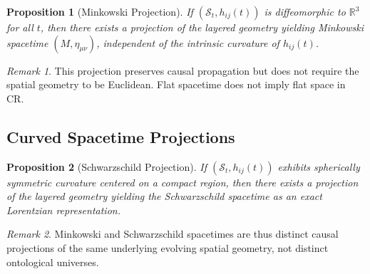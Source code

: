 \documentclass[11pt,a4paper]{article}
\theoremstyle{plain}
\newtheorem{proposition}{Proposition}
\theoremstyle{definition}
\theoremstyle{remark}
\newtheorem{remark}{Remark}
\begin{document}
\begin{proposition}[Minkowski Projection]
If $(\mathcal{S}_t,h_{ij}(t))$ is diffeomorphic to $\mathbb{R}^3$ for all $t$, then there exists a projection of the layered geometry yielding Minkowski spacetime $(M,\eta_{\mu\nu})$, independent of the intrinsic curvature of $h_{ij}(t)$.
\end{proposition}

\begin{remark}
This projection preserves causal propagation but does not require the spatial geometry to be Euclidean. Flat spacetime does not imply flat space in CR.
\end{remark}

\subsection{Curved Spacetime Projections}

\begin{proposition}[Schwarzschild Projection]
If $(\mathcal{S}_t,h_{ij}(t))$ exhibits spherically symmetric curvature centered on a compact region, then there exists a projection of the layered geometry yielding the Schwarzschild spacetime \cite{Schwarzschild1916} as an exact Lorentzian representation.
\end{proposition}

\begin{remark}
Minkowski and Schwarzschild spacetimes are thus distinct causal projections of the same underlying evolving spatial geometry, not distinct ontological universes.
\end{remark}
\end{document}
